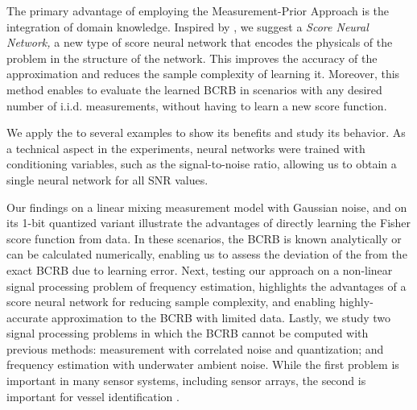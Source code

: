 \documentclass[journal,twoside,web]{ieeecolor}
\begin{document}
The primary advantage of employing the {Measurement-Prior} Approach is the integration of domain {knowledge}. {Inspired by \cite{faroughi2024physics,meinders2024application}, we suggest a \emph{\pe{} Score Neural Network,} a new type of score neural network that encodes the physicals of the problem in the structure of the network. This improves the accuracy of the approximation and {reduces} the sample complexity of learning it.} Moreover, this method enables to evaluate the learned BCRB in scenarios with {any desired number of} i.i.d. measurements, without {having to learn} a new score function.




We apply the \name{} %
to several examples to show its benefits and {study} its behavior. {As a technical aspect in the experiments, neural networks were trained with conditioning variables\cite{mirza2014conditional,abdelhamed2019noise,liu2019conditional,ho2021classifier}, 
such as the signal-to-noise ratio, allowing us to obtain a single neural network for all SNR values.}


Our findings on a linear mixing measurement model with Gaussian noise,  and on its {1-bit} quantized variant illustrate the advantages of directly learning the Fisher score function from data. In these scenarios, the BCRB is known analytically or can be calculated numerically,
{enabling us to assess} the  {deviation of the \name{} from the exact BCRB due to learning error.} {Next, testing} 
 our approach on a non-linear signal processing problem of frequency estimation, highlights the advantages of a \pe{} score neural network {for reducing}
 sample complexity, {and enabling highly-accurate approximation to the BCRB with limited data.}
Lastly, we {study} two signal processing problems in which the BCRB cannot be computed with previous methods: %
measurement with correlated noise and quantization; and frequency estimation with underwater ambient noise. {While the first problem is important in many sensor systems, including sensor arrays, the second is important for vessel identification \cite{erbe2019effects}.}  
\end{document}
